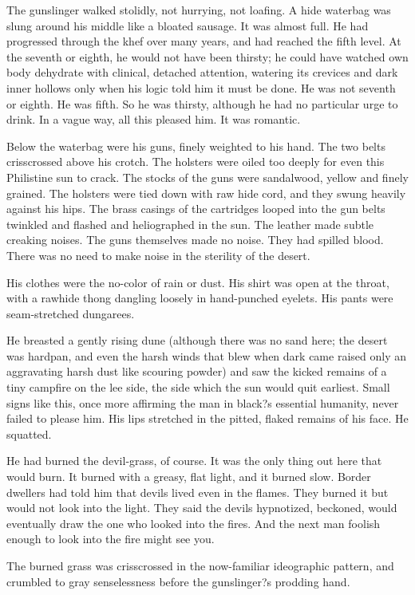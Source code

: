 \documentclass[
11pt,%
tightenlines,%
twoside,%
onecolumn,%
nofloats,%
nobibnotes,%
nofootinbib,%
superscriptaddress,%
noshowpacs,%
centertags]%
{revtex4}
\begin{document}
The gunslinger walked stolidly, not hurrying, not loafing. A hide waterbag was slung around his middle like a bloated sausage. It was almost full. He had progressed through the khef over many years, and had reached the fifth level. At the seventh or eighth, he would not have been thirsty; he could have watched own body dehydrate with clinical, detached attention, watering its crevices and dark inner hollows only when his logic told him it must be done. He was not seventh or eighth. He was fifth. So he was thirsty, although he had no particular urge to drink. In a vague way, all this pleased him. It was romantic.

Below the waterbag were his guns, finely weighted to his hand. The two belts crisscrossed above his crotch. The holsters were oiled too deeply for even this Philistine sun to crack. The stocks of the guns were sandalwood, yellow and finely grained. The holsters were tied down with raw hide cord, and they swung heavily against his hips. The brass casings of the cartridges looped into the gun belts twinkled and flashed and heliographed in the sun. The leather made subtle creaking noises. The guns themselves made no noise. They had spilled blood. There was no need to make noise in the sterility of the desert.

His clothes were the no-color of rain or dust. His shirt was open at the throat, with a rawhide thong dangling loosely in hand-punched eyelets. His pants were seam-stretched dungarees.

He breasted a gently rising dune (although there was no sand here; the desert was hardpan, and even the harsh winds that blew when dark came raised only an aggravating harsh dust like scouring powder) and saw the kicked remains of a tiny campfire on the lee side, the side which the sun would quit earliest. Small signs like this, once more affirming the man in black?s essential humanity, never failed to please him. His lips stretched in the pitted, flaked remains of his face. He squatted.

He had burned the devil-grass, of course. It was the only thing out here that would burn. It burned with a greasy, flat light, and it burned slow. Border dwellers had told him that devils lived even in the flames. They burned it but would not look into the light. They said the devils hypnotized, beckoned, would eventually draw the one who looked into the fires. And the next man foolish enough to look into the fire might see you.

The burned grass was crisscrossed in the now-familiar ideographic pattern, and crumbled to gray senselessness before the gunslinger?s prodding hand. 
\end{document}
